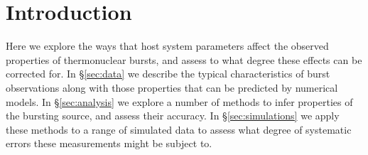 \documentclass{aastex61}
\begin{document}
\section{Introduction} \label{sec:intro}

Here we explore the ways that host system  parameters affect the observed properties of thermonuclear bursts, and assess to what degree these effects can be corrected for.
%
In \S\ref{sec:data} we describe the typical characteristics of burst observations along with those properties that can be predicted by numerical models.
% 
In \S\ref{sec:analysis} we explore a number of methods to infer properties of the bursting source, and assess their accuracy.
%
In \S\ref{sec:simulations} we apply these methods to a range of simulated data to assess what degree of systematic errors these measurements might be subject to.
\end{document}
